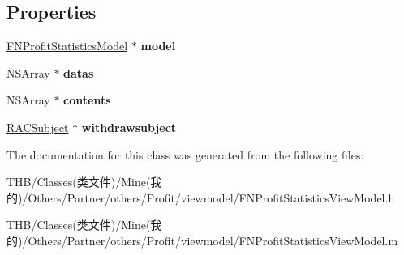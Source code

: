 \subsection*{Properties}
\begin{DoxyCompactItemize}
\item 
\mbox{\label{interface_f_n_profit_statistics_view_model_a46e998a5e8ff12263c5b7092180460ef}} 
\mbox{\hyperlink{interface_f_n_profit_statistics_model}{F\+N\+Profit\+Statistics\+Model}} $\ast$ {\bfseries model}
\item 
\mbox{\label{interface_f_n_profit_statistics_view_model_a6ecedaec6f5e0ef2b4696477aa74e21c}} 
N\+S\+Array $\ast$ {\bfseries datas}
\item 
\mbox{\label{interface_f_n_profit_statistics_view_model_a829b70b718ab2b9a724804eeb773f30f}} 
N\+S\+Array $\ast$ {\bfseries contents}
\item 
\mbox{\label{interface_f_n_profit_statistics_view_model_acd9a14cfd5158c8714de614cf7c38a86}} 
\mbox{\hyperlink{interface_r_a_c_subject}{R\+A\+C\+Subject}} $\ast$ {\bfseries withdrawsubject}
\end{DoxyCompactItemize}


The documentation for this class was generated from the following files\+:\begin{DoxyCompactItemize}
\item 
T\+H\+B/\+Classes(类文件)/\+Mine(我的)/\+Others/\+Partner/others/\+Profit/viewmodel/F\+N\+Profit\+Statistics\+View\+Model.\+h\item 
T\+H\+B/\+Classes(类文件)/\+Mine(我的)/\+Others/\+Partner/others/\+Profit/viewmodel/F\+N\+Profit\+Statistics\+View\+Model.\+m\end{DoxyCompactItemize}
